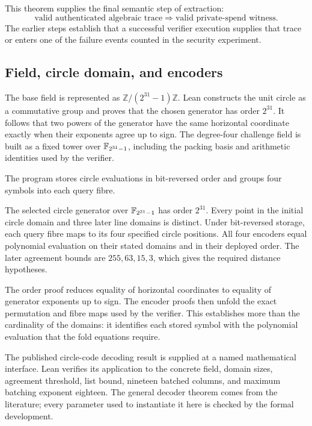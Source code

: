 This theorem supplies the final semantic step of extraction:
\[
  \text{valid authenticated algebraic trace}
  \Longrightarrow
  \text{valid private-spend witness}.
\]
The earlier steps establish that a successful verifier execution supplies
that trace or enters one of the failure events counted in the security
experiment.

\subsection{Field, circle domain, and encoders}

The base field is represented as \(\mathbb Z/(2^{31}-1)\mathbb Z\).  Lean
constructs the unit circle as a commutative group and proves that the chosen
generator has order \(2^{31}\).  It follows that two powers of the generator
have the same horizontal coordinate exactly when their exponents agree up to
sign.  The degree-four challenge field is built as a fixed tower over \(\mathbb{F}_{2^{31}-1}\),
including the packing basis and arithmetic identities used by the verifier.

The program stores circle evaluations in bit-reversed order and groups four
symbols into each query fibre.

\begin{theorem}
\label{thm:domains-encoders}
The selected circle generator over \(\mathbb{F}_{2^{31}-1}\) has order \(2^{31}\).  Every point
in the initial circle domain and three later line domains is distinct.  Under
bit-reversed storage, each query fibre maps to its four specified circle
positions.  All four encoders equal polynomial evaluation on their stated
domains and in their deployed order.  The later agreement bounds are
\(255,63,15,3\), which gives the required distance hypotheses.
\end{theorem}

The order proof reduces equality of horizontal coordinates to equality of
generator exponents up to sign.  The encoder proofs then unfold the exact
permutation and fibre maps used by the verifier.  This establishes more than
the cardinality of the domains: it identifies each stored symbol with the
polynomial evaluation that the fold equations require.

The published circle-code decoding result is supplied at a named mathematical
interface.  Lean verifies its application to the concrete field, domain
sizes, agreement threshold, list bound, nineteen batched columns, and maximum
batching exponent eighteen.  The general decoder theorem comes from the
literature; every parameter used to instantiate it here is checked by the
formal development.

